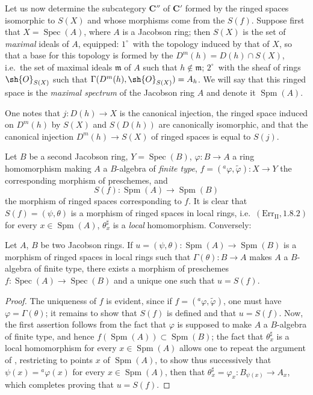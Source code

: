 \begin{env}[10.9.3]
\label{IV.10.9.3}
Let us now determine the subcategory $\mathbf{C}''$ of $\mathbf{C}'$ formed by the ringed spaces isomorphic to $S(X)$ and whose morphisms come from the $S(f)$.
Suppose first that $X=\operatorname{Spec}(A)$, where $A$ is a Jacobson ring; then $S(X)$ is the set of \emph{maximal} ideals of $A$, equipped: $1^\circ$~with the topology induced by that of $X$, so that a base for this topology is formed by the $D^m(h)=D(h)\cap S(X)$, i.e.\ the set of maximal ideals $\mathfrak{m}$ of $A$ such that $h\notin\mathfrak{m}$; $2^\circ$~with the sheaf of rings $\sh{O}_{S(X)}$ such that $\Gamma(D^m(h),\sh{O}_{S(X)})=A_h$.
We will say that this ringed space is the \emph{maximal spectrum} of the Jacobson ring $A$ and denote it $\operatorname{Spm}(A)$.

One notes that $j:D(h)\to X$ is the canonical injection, the ringed space induced on $D^m(h)$ by $S(X)$ and $S(D(h))$ are canonically isomorphic, and that the canonical injection $D^m(h)\to S(X)$ of ringed spaces is equal to $S(j)$.

Let $B$ be a second Jacobson ring, $Y=\operatorname{Spec}(B)$, $\varphi:B\to A$ a ring homomorphism making $A$ a $B$-algebra of \emph{finite type}, $f=({}^a\varphi,\widetilde{\varphi}):X\to Y$ the corresponding morphism of preschemes, and
\[
  S(f):\operatorname{Spm}(A)\to\operatorname{Spm}(B)
\]
the morphism of ringed spaces corresponding to $f$.
It is clear that $S(f)=(\psi,\theta)$ is a morphism of ringed spaces in local rings, i.e.\ $(\mathrm{Err}_{\mathrm{II}},1.8.2)$ for every $x\in\operatorname{Spm}(A)$, $\theta^\sharp_x$ is a \emph{local} homomorphism.
Conversely:
\end{env}

\begin{proposition}[10.9.4]
\label{IV.10.9.4}
Let $A$, $B$ be two Jacobson rings.
If $u=(\psi,\theta):\operatorname{Spm}(A)\to\operatorname{Spm}(B)$ is a morphism of ringed spaces in local rings such that $\Gamma(\theta):B\to A$ makes $A$ a $B$-algebra of finite type, there exists a morphism of preschemes $f:\operatorname{Spec}(A)\to\operatorname{Spec}(B)$ and a unique one such that $u=S(f)$.
\end{proposition}

\begin{proof}
The uniqueness of $f$ is evident, since if $f=({}^a\varphi,\widetilde{\varphi})$, one must have $\varphi=\Gamma(\theta)$; it remains to show that $S(f)$ is defined and that $u=S(f)$.
Now, the first assertion follows from the fact that $\varphi$ is supposed to make $A$ a $B$-algebra of finite type, and hence $f(\operatorname{Spm}(A))\subset\operatorname{Spm}(B)$; the fact that $\theta^\sharp_x$ is a local homomorphism for every $x\in\operatorname{Spm}(A)$ allows one to repeat the argument of , restricting to points $x$ of $\operatorname{Spm}(A)$, to show thus successively that $\psi(x)={}^a\varphi(x)$ for every $x\in\operatorname{Spm}(A)$, then that $\theta^\sharp_x=\varphi_x:B_{\psi(x)}\to A_x$, which completes proving that $u=S(f)$.
\end{proof}

